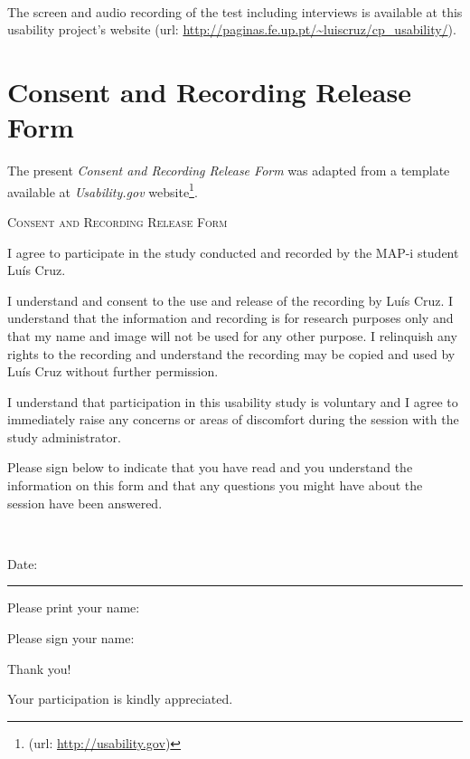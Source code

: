 \documentclass[a4paper]{article}
\begin{document}
\paragraph{} The screen and audio recording of the test including interviews is available at this usability project's website (url: \url{http://paginas.fe.up.pt/~luiscruz/cp_usability/}).


\appendix

\section{Consent and Recording Release Form}
The present \emph{Consent and Recording Release Form} was adapted from a template available at \textit{Usability.gov} website\footnote{(url: \url{http://usability.gov})}.

\begin{oframed}
  \begin{center}
    \large \textsc{Consent and Recording Release Form}
  \end{center} 
I agree to participate in the study conducted and recorded by the MAP-i student Luís Cruz. 

I understand and consent to the use and release of the recording by Luís Cruz. I understand that the information and recording is for research purposes only and that my name and image will not be used for any other purpose. I relinquish any rights to the recording and understand the recording may be copied and used by Luís Cruz without further permission. 

I understand that participation in this usability study is voluntary and I agree to immediately raise any concerns or areas of discomfort during the session with the study administrator.

Please sign below to indicate that you have read and you understand the information on this form and that any questions you might have about the session have been answered. 

~

Date: \rule{2cm}{0.4pt} 

Please print your name: \hrulefill

Please sign your name: \hrulefill



Thank you!

Your participation is kindly appreciated.
\end{oframed}
\end{document}
